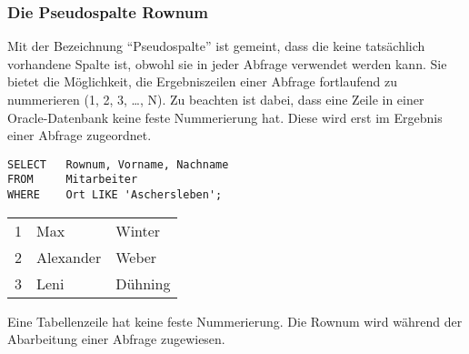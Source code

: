         \subsubsection{Die Pseudospalte Rownum}
          Mit der Bezeichnung \enquote{Pseudospalte} ist gemeint, dass die  keine tats\"achlich vorhandene Spalte ist, obwohl sie in jeder Abfrage verwendet werden kann. Sie bietet die M\"oglichkeit, die Ergebniszeilen einer Abfrage fortlaufend zu nummerieren (1, 2, 3, \dots, N). Zu beachten ist dabei, dass eine Zeile in einer Oracle-Datenbank keine feste Nummerierung hat. Diese wird erst im Ergebnis einer Abfrage zugeordnet.
          \begin{lstlisting}[language=oracle_sql,caption={Ein einfaches Beispiel f\"ur die Rownum},label=sql06_11]
SELECT   Rownum, Vorname, Nachname
FROM     Mitarbeiter
WHERE    Ort LIKE 'Aschersleben';
          \end{lstlisting}
          \begin{center}
            \begin{small}
              \tablehead{}
              \tabletail {
              }

              \begin{oraclesql}
                \begin{supertabular}{rll}
                  1 & Max & Winter \\
                  2 & Alexander & Weber \\
                  3 & Leni & D\"uhning \\
                \end{supertabular}
              \end{oraclesql}
            \end{small}
          \end{center}
          \begin{merke}
            Eine Tabellenzeile hat keine feste Nummerierung. Die Rownum wird w\"ahrend der Abarbeitung einer Abfrage zugewiesen.
          \end{merke}
